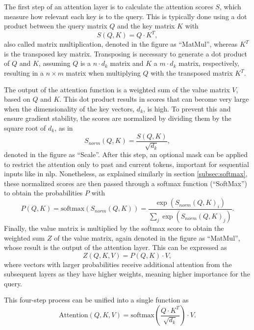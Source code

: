 The first step of an attention layer is to calculate the attention scores \( S \), which measure how relevant each key is to the query. This is typically done using a dot product between the query matrix \( Q \) and the key matrix \( K \) with
\begin{equation}
    S(Q, K) = Q \cdot K^T,
\end{equation}
also called matrix multiplication, denoted in the figure as \enquote{MatMul}, whereas \( K^T \) is the transposed key matrix. Transposing is necessary to generate a dot product of \( Q \) and \( K \), assuming \( Q \) is a \( n \cdot d_k \) matrix and \( K \) a \( m \cdot d_k \) matrix, respectively, resulting in a \( n \times m \) matrix when multiplying \( Q \) with the transposed matrix \( K^T \).

The output of the attention function is a weighted sum of the value matrix \( V \), based on \( Q \) and \( K \). This dot product results in scores that can become very large when the dimensionality of the key vectors, \( d_k \), is high. To prevent this and ensure gradient stability, the scores are normalized by dividing them by the square root of \( d_k \), as in
\begin{equation}
    S_{norm}(Q, K) = \frac{S(Q, K)}{\sqrt{d_k}},
\end{equation}
denoted in the figure as \enquote{Scale}. After this step, an optional mask can be applied to restrict the attention only to past and current tokens, important for sequential inputs like in \gls{nlp}. Nonetheless, as explained similarly in section \ref{subsec:softmax}, these normalized scores are then passed through a softmax function (\enquote{SoftMax}) to obtain the probabilities \( P \) with
\begin{equation}
    P(Q, K) = \text{softmax}(S_{norm}(Q, K)) = \frac{\exp(S_{norm}(Q, K)_i)}{\sum_{j} \exp(S_{norm}(Q, K)_j)}.
\end{equation}
Finally, the value matrix is multiplied by the softmax score to obtain the weighted sum \( Z \) of the value matrix, again denoted in the figure as \enquote{MatMul}, whose result is the output of the attention layer. This can be expressed as
\begin{equation}
    Z(Q, K, V) = P(Q, K) \cdot V,
\end{equation}
where vectors with larger probabilities receive additional attention from the subsequent layers as they have higher weights, meaning higher importance for the query. 

This four-step process can be unified into a single function \autocite{Vaswani.Shazeer.ea2017} as
\begin{equation}
    \text{Attention}(Q, K, V) = \text{softmax}\left(\frac{Q \cdot K^T}{\sqrt{d_k}}\right) \cdot V.
\end{equation}

